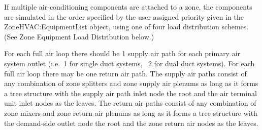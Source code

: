 If multiple air-conditioning components are attached to a zone, the components are simulated in the order specified by the user assigned priority given in the ZoneHVAC:EquipmentList object, using one of four load distribution schemes. (See Zone Equipment Load Distribution below.)

For each full air loop there should be 1 supply air path for each primary air system outlet (i.e.~1 for single duct systems,~ 2 for dual duct systems). For each full air loop there may be one return air path. The supply air paths consist of any combination of zone splitters and zone supply air plenums as long as it forms a tree structure with the supply air path inlet node the root and the air terminal unit inlet nodes as the leaves. The return air paths consist of any combination of zone mixers and zone return air plenums as long as it forms a tree structure with the demand-side outlet node the root and the zone return air nodes as the leaves.

